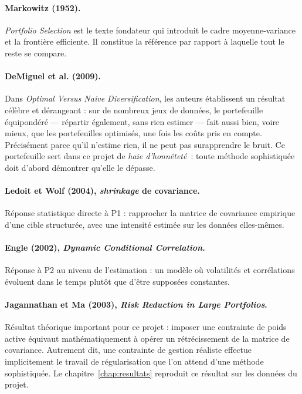 \paragraph{Markowitz (1952).} \emph{Portfolio Selection} est le texte fondateur qui
introduit le cadre moyenne-variance et la frontière efficiente. Il constitue la
référence par rapport à laquelle tout le reste se compare.

\paragraph{DeMiguel et al. (2009).} Dans \emph{Optimal Versus Naive
Diversification}, les auteurs établissent un résultat célèbre et dérangeant : sur de nombreux jeux de
données, le portefeuille équipondéré — répartir également, sans rien estimer —
fait aussi bien, voire mieux, que les portefeuilles optimisés, une fois les coûts
pris en compte. Précisément parce qu'il n'estime rien, il ne peut pas
surapprendre le bruit. Ce portefeuille sert dans ce projet de \emph{haie
d'honnêteté}~: toute méthode sophistiquée doit d'abord démontrer qu'elle le
dépasse.

\paragraph{Ledoit et Wolf (2004), \emph{shrinkage} de covariance.} Réponse
statistique directe à P1 : rapprocher la matrice de covariance empirique d'une
cible structurée, avec une intensité estimée sur les données elles-mêmes.

\paragraph{Engle (2002), \emph{Dynamic Conditional Correlation}.} Réponse à P2 au
niveau de l'estimation : un modèle où volatilités et corrélations évoluent dans le
temps plutôt que d'être supposées constantes.

\paragraph{Jagannathan et Ma (2003), \emph{Risk Reduction in Large Portfolios}.}
Résultat théorique important pour ce projet : imposer une contrainte de poids
active équivaut mathématiquement à opérer un rétrécissement de la matrice de
covariance. Autrement dit, une contrainte de gestion réaliste effectue
implicitement le travail de régularisation que l'on attend d'une méthode
sophistiquée. Le chapitre~\ref{chap:resultats} reproduit ce résultat sur les
données du projet.

